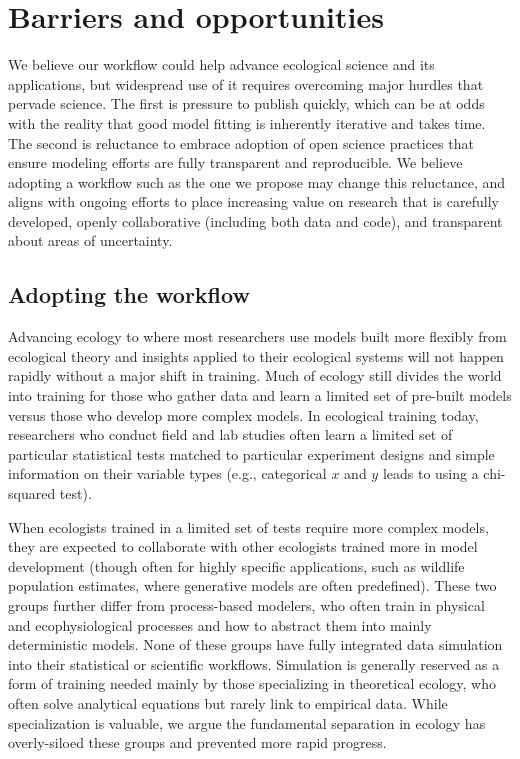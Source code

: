 \documentclass[11pt]{article}
\newcommand{\llabel}[1]{\hypertarget{lintarget:#1}{}\linelabel{lin:#1}}
\begin{document}
\clearpage
\section{Barriers and opportunities}

We believe our workflow could help advance ecological science and its applications, but widespread use of it requires overcoming major hurdles that pervade science.  
The first is pressure to publish quickly, which can be at odds with the reality that good model fitting is inherently iterative and takes time. The second is reluctance to embrace adoption of open science practices that ensure modeling efforts are fully transparent and reproducible. 
We believe adopting a workflow such as the one we propose may change this reluctance, and aligns with ongoing efforts to place increasing value on research that is carefully developed, openly collaborative (including both data and code), and transparent about areas of uncertainty.

\subsection{Adopting the workflow}

Advancing ecology to where most researchers use models built more flexibly from ecological theory and insights applied to their ecological systems will not happen rapidly without a major shift in training. Much of ecology still divides the world into training for those who gather data and learn a limited set of pre-built models versus those who develop more complex models. In ecological training today, researchers who conduct field and lab studies often learn a limited set of particular statistical tests matched to particular experiment designs and simple information on their variable types (e.g., categorical $x$ and $y$ leads to using a chi-squared test).

When ecologists trained in a limited set of tests require more complex models, they are expected to collaborate with other ecologists \llabel{collab1} trained more in model development (though often for highly specific applications, such as wildlife population estimates, where generative models are often predefined). These two groups further differ from process-based modelers, who often train in physical and ecophysiological processes and how to abstract them into mainly deterministic models.
None of these groups have fully integrated data simulation into their statistical or scientific workflows. Simulation is generally reserved as a form of training needed mainly by those specializing in theoretical ecology, who often solve analytical equations but rarely link to empirical data. While specialization is valuable, we argue the fundamental %
separation in ecology has overly-siloed these groups and prevented more rapid progress.
\end{document}
